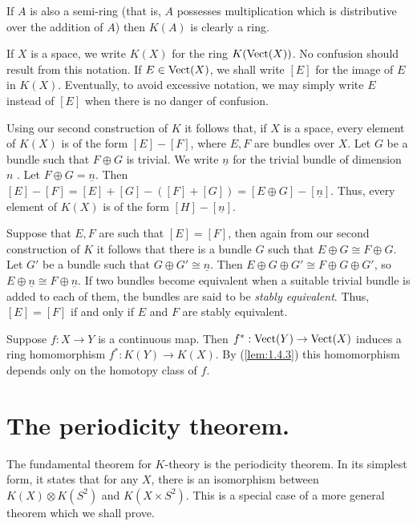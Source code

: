 If $A$ is also a semi-ring (that is, $A$ possesses multiplication which is distributive over the addition of $A$) then $K(A)$ is clearly a ring. \par \hfill

If $X$ is a space, we write $K(X)$ for the ring $K(\operatorname{Vect}(X))$. No confusion should result from this notation. If $E \in \operatorname{Vect}(X)$, we shall write $[E]$ for the image of $E$ in $K(X)$. Eventually, to avoid excessive notation, we may simply write $E$ instead of $[E]$ when there is no danger of confusion. \par 

Using our second construction of $K$ it follows that, if $X$ is a space, every element of $K(X)$ is of the form $[E] - [F]$, where $E, F$ are bundles over $X$. Let $G$ be a bundle such that $F \oplus G$ is trivial. We write $\underline{n}$ for the trivial bundle of dimension $n$ . Let $F \oplus G = \underline{n}$. Then $[E] - [F] = [E] + [G] - ([F] + [G]) = [E \oplus G] - [\underline{n}]$. Thus, every element of $K(X)$ is of the form $[H] -  [\underline{n}]$. \par 

Suppose that $E, F$ are such that $[E] = [F]$, then again from our second construction of $K$ it follows that there is a bundle $G$ such that $E \oplus G \cong F \oplus G$. Let $G'$ be a bundle such that $G \oplus G' \cong \underline{n}$. Then $E \oplus G \oplus G' \cong F \oplus G \oplus G'$, so $E \oplus \underline{n} \cong F \oplus \underline{n}$. If two bundles become equivalent when a suitable trivial bundle is added to each of them, the bundles are said to be \textit{stably equivalent}. Thus, $[E] = [F]$ if and only if $E$ and $F$ are stably equivalent. \par 

Suppose $f: X \to Y$ is a continuous map. Then $f^*: \operatorname{Vect}(Y) \to \operatorname{Vect}(X)$ induces a ring homomorphism $f^*: K(Y) \to K(X)$. By (\ref{lem:1.4.3}) this homomorphism depends only on the homotopy class of $f$. \newpage


\section{The periodicity theorem.}\label{sec:2.2} The fundamental theorem for $K$-theory is the periodicity theorem. In its simplest form, it states that for any $X$, there is an isomorphism between $K(X) \otimes K(S^2)$ and $K(X \times S^2)$. This is a special case of a more general theorem which we shall prove. \par 


